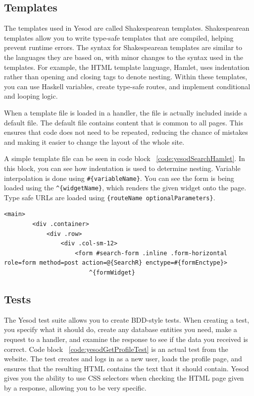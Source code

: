\subsection{Templates}

The templates used in Yesod are called Shakespearean templates. Shakespearean templates
allow you to write type-safe templates that are compiled, helping prevent runtime errors.
The syntax for Shakespearean templates are similar to the languages they are based on,
with minor changes to the syntax used in the templates. For example, the HTML template language, Hamlet,
uses indentation rather than opening and closing tags to denote nesting. Within these
templates, you can use Haskell variables, create type-safe routes, and implement conditional
and looping logic. \parencite[Shakespearean Templates]{yesodBook}

When a template file is loaded in a handler, the file is actually included inside
a default file. The default file contains content that is common to all pages. This
ensures that code does not need to be repeated, reducing the chance of mistakes and
making it easier to change the layout of the whole site.

A simple template file can be seen in code block ~\ref{code:yesodSearchHamlet}. In this
block, you can see how indentation is used to determine nesting. Variable interpolation
is done using \texttt{\#\{variableName\}}. You can see the form is being loaded using
the \texttt{\string^\{widgetName\}}, which renders the given widget onto the page. Type safe
URLs are loaded using \texttt{\string@\{routeName optionalParameters\}}.

\begin{lstlisting}[caption={Template file for the search page},label={code:yesodSearchHamlet}]
	<main>
		<div .container>
			<div .row>
				<div .col-sm-12>
					<form #search-form .inline .form-horizontal role=form method=post action=@{SearchR} enctype=#{formEnctype}>
						^{formWidget}

\end{lstlisting}

\subsection{Tests}
The Yesod test suite allows you to create BDD-style tests. When creating a test,
you specify what it should do, create any database entities you need, make a
request to a handler, and examine the response to see if the data you received
is correct. Code block ~\ref{code:yesodGetProfileTest} is an actual test
from the website. The test creates and logs in as a new user, loads
the profile page, and ensures that the resulting HTML contains the text that
it should contain. Yesod gives you the ability to use CSS selectors when checking
the HTML page given by a response, allowing you to be very specific.

